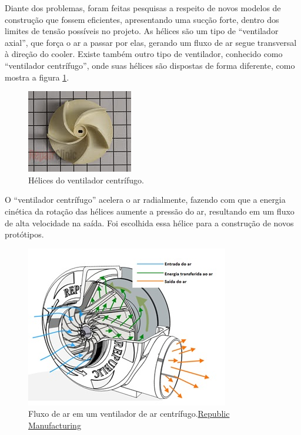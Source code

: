 		Diante dos problemas, foram feitas pesquisas a respeito de novos modelos de construção que fossem eficientes, apresentando uma sucção forte, dentro dos limites de tensão possíveis no projeto. As hélices são um tipo de “ventilador axial”, que força o ar a passar por elas, gerando um fluxo de ar segue transversal à direção do cooler. Existe também outro tipo de ventilador, conhecido como “ventilador centrífugo”, onde suas hélices são dispostas de forma diferente, como mostra a figura \ref{img:ventilador_centrífugo}.

		\begin{figure}[H]
			\centering
			\includegraphics[scale=1]{figuras/asppc2_5.jpg}
			\caption{Hélices do ventilador centrífugo.}
			\label{img:ventilador_centrífugo}
		\end{figure}

		O “ventilador centrífugo” acelera o ar radialmente, fazendo com que a energia cinética da rotação das hélices aumente a pressão do ar, resultando em um fluxo de alta velocidade na saída. Foi escolhida essa hélice para a construção de novos protótipos.

		\begin{figure}[H]
			\centering
			\includegraphics[scale=1]{figuras/asppc2_6.jpg}
			\caption{Fluxo de ar em um ventilador de ar centrífugo.\href{https://www.republic-mfg.com/blowers/republic-centrifugal-blower.asp}{Republic Manufacturing}}
			\label{img:fluxo_de_ar_ventilador_centrífugo}
		\end{figure}

